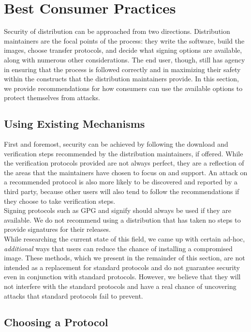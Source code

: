 \documentclass[conference]{IEEEtran}
\begin{document}
\section{Best Consumer Practices}

Security of distribution can be approached from two directions. Distribution
maintainers are the focal points of the process: they write the software, build the images,
choose transfer protocols, and decide what signing options are available, along with numerous
other considerations. The end user, though, still has agency in ensuring that the process is
followed correctly and in maximizing their safety within the constructs that the distribution
maintainers provide. In this section, we provide recommendations for how consumers can use
the available options to protect themselves from attacks.

\subsection{Using Existing Mechanisms}

First and foremost, security can be achieved by following the download and verification steps
recommended by the distribution maintainers, if offered. While the verification protocols
provided are not always perfect, they are a reflection of the areas that the maintainers have
chosen to focus on and support. An attack on a recommended protocol is also more likely to be
discovered and reported by a third party, because other users will also tend to follow the
recommendations if they choose to take verification steps.\\
\indent Signing protocols such as GPG and signify should always be used if they are
available. We do not recommend using a distribution that has taken no steps to provide
signatures for their releases.\\
\indent While researching the current state of this field, we came up with certain ad-hoc,
\emph{additional} ways that users can reduce the chance of installing a compromised image.
These methods, which we present in the remainder of this section, are not intended as a
replacement for standard protocols and do not guarantee security even in conjunction with
standard protocols. However, we believe that they will not interfere with the standard
protocols and have a real chance of uncovering attacks that standard protocols fail to
prevent.

\subsection{Choosing a Protocol}
\end{document}
